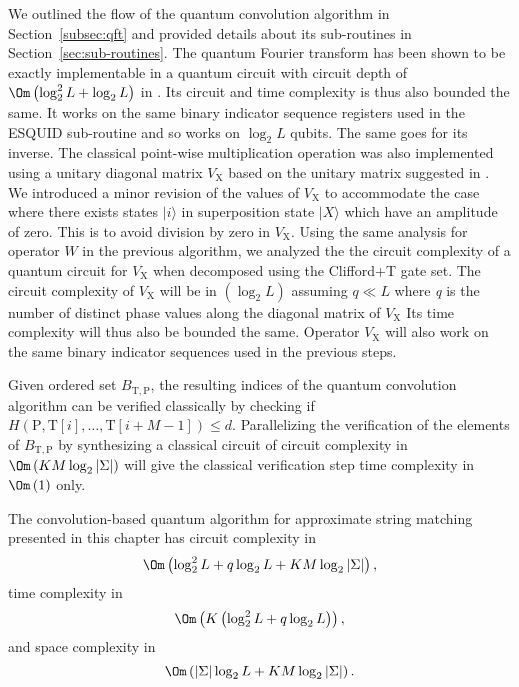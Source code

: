 We outlined the flow of the quantum convolution algorithm in Section~\ref{subsec:qft} and provided details about its sub-routines in Section~\ref{sec:sub-routines}. The quantum Fourier transform has been shown to be exactly implementable in a quantum circuit with circuit depth of $\Om\left( \log_2^2 L + \log_2 L\right)$ in \cite{Shor2004}. Its circuit and time complexity is thus also bounded the same. It works on the same binary indicator sequence registers used in the ESQUID sub-routine and so works on $\log_2 L$ qubits. The same goes for its inverse. The classical point-wise multiplication operation was also implemented using a unitary diagonal matrix $V_\mathrm{X}$ based on the unitary matrix suggested in \cite{Curtis2004}. We introduced a minor revision of the values of $V_{\mathrm{X}}$ to accommodate the case where there exists states $\vert i \rangle$ in superposition state $\vert X \rangle$ which have an amplitude of zero. This is to avoid division by zero in $V_{\mathrm{X}}$. Using the same analysis for operator $W$ in the previous algorithm, we analyzed the the circuit complexity of a quantum circuit for $V_{\mathrm{X}}$ when decomposed using the Clifford+T gate set. The circuit complexity of $V_{\mathrm{X}}$ will be in $\left( \log_2 L \right)$ assuming $q \ll L$ where \textit{q} is the number of distinct phase values along the diagonal matrix of $V_{\mathrm{X}}$ Its time complexity will thus also be bounded the same. Operator $V_{\mathrm{X}}$ will also work on the same binary indicator sequences used in the previous steps.

Given ordered set $B_{\mathrm{T},\mathrm{P}}$, the resulting indices of the quantum convolution algorithm can be verified classically by checking if $H\left( \mathrm{P}, \mathrm{T}[i],\ldots,\mathrm{T}[i+M-1] \right) \leq d$. Parallelizing the verification of the elements of $B_{\mathrm{T},\mathrm{P}}$ by synthesizing a classical circuit of circuit complexity in $\Om\left(KM\log_2 \vert \Sigma \vert \right)$ will give the classical verification step time complexity in $\Om\left( 1 \right)$ only.

The convolution-based quantum algorithm for approximate string matching presented in this chapter has circuit complexity in
\[
	\Om\left( \log_2^2 L + q\log_2 L + KM\log_2 \vert \Sigma \vert \right),
\]
time complexity in
\[
	\Om\left( K\left(\log_2^2 L + q\log_2 L \right) \right),
\]
and space complexity in
\[
	\Om\left(\vert \Sigma \vert\log_2 L + KM\log_2 \vert \Sigma \vert \right).
\]







